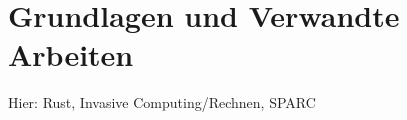 \chapter{Grundlagen und Verwandte Arbeiten}\label{sec:basics}

Hier: Rust, Invasive Computing/Rechnen, SPARC
